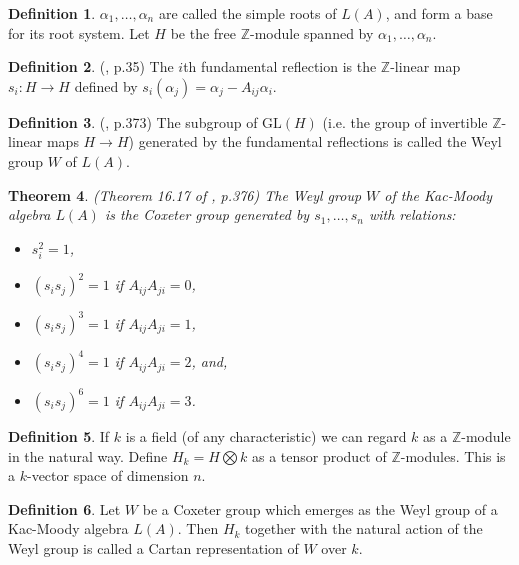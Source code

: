 \documentclass[11pt,a4paper]{report}
\newtheorem{theorem}{Theorem}[chapter]
\theoremstyle{definition}
\newtheorem{definition}[theorem]{Definition}
\begin{document}
 \begin{definition} \label{def:simpleroots} $\alpha_1, \ldots, \alpha_n$ are called the simple roots of $L(A)$, and form a base for its root system. Let $H$ be the free $\mathbb{Z}$-module spanned by $\alpha_1, \ldots, \alpha_n$. \end{definition}

 \begin{definition}(\cite{Kac}, p.35) The $i$th fundamental reflection is the $\mathbb{Z}$-linear map $s_i: H \to H$ defined by $s_i(\alpha_j) = \alpha_j - A_{ij} \alpha_i$.\end{definition}

\begin{definition} (\cite{Carter}, p.373) The subgroup of $\mathrm{GL}(H)$ (i.e. the group of invertible $\mathbb{Z}$-linear maps $H \to H$) generated by the fundamental reflections is called the Weyl group $W$ of $L(A)$. \end{definition}

\begin{theorem} \label{thm:weyliscoxeter} (Theorem 16.17 of \cite{Carter}, p.376) The Weyl group $W$ of the Kac-Moody algebra $L(A)$ is the Coxeter group generated by $s_1, \ldots, s_n$ with relations:
\begin{itemize}
\item$s_i^2 = 1$,
\item$(s_i s_j)^2 = 1$ if $A_{ij} A_{ji} = 0$,
\item $(s_i s_j)^3 = 1$ if $A_{ij} A_{ji} = 1$,
\item $(s_i s_j)^4 = 1$ if $A_{ij} A_{ji} = 2$, and,
\item $(s_i s_j)^6 = 1$ if $A_{ij} A_{ji} = 3$.\end{itemize}\end{theorem}


\begin{definition}If $k$ is a field (of any characteristic) we can regard $k$ as a $\mathbb{Z}$-module in the natural way. Define $H_k = H \bigotimes k$ as a tensor product of $\mathbb{Z}$-modules. This is a $k$-vector space of dimension $n$.\end{definition}

\begin{definition} Let $W$ be a Coxeter group which emerges as the Weyl group of a Kac-Moody algebra $L(A)$. Then $H_k$ together with the natural action of the Weyl group is called a Cartan representation of $W$ over $k$.\end{definition}
\end{document}
